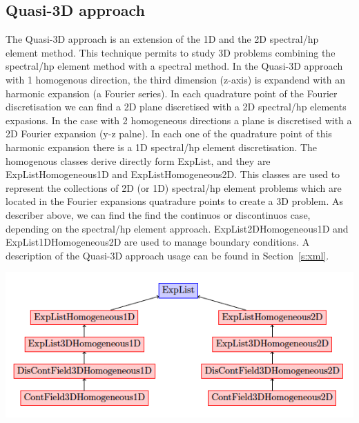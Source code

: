 \subsection{Quasi-3D approach}

The Quasi-3D approach is an extension of the 1D and the 2D spectral/hp element
method. This technique permits to study 3D problems combining the spectral/hp
element method with a spectral method. In the Quasi-3D approach with 1
homogenous direction, the third dimension (z-axis) is expandend with an harmonic
expansion (a Fourier series). In each quadrature point of the Fourier
discretisation we can find a 2D plane discretised with a 2D spectral/hp elements
expasions. In the case with 2 homogeneous directions a plane is discretised with
a 2D Fourier expansion (y-z palne). In each one of the quadrature point of this
harmonic expansion there is a 1D spectral/hp element discretisation. The
homogenous classes derive directly form ExpList, and they are
ExpListHomogeneous1D and ExpListHomogeneous2D. This classes are used to
represent the collections of 2D (or 1D) spectral/hp element problems which are
located in the Fourier expansions quatradure points to create a 3D problem. As
describer above, we can find the find the continuos or discontinuos case,
depending on the spectral/hp element approach. ExpList2DHomogeneous1D and
ExpList1DHomogeneous2D are used to manage boundary conditions. A description of
the Quasi-3D approach usage can be found in Section~\ref{s:xml}.

\begin{center}
\includegraphics{img/Quasi3d.png}
\end{center}
